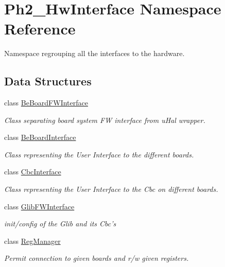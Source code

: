 \hypertarget{namespace_ph2___hw_interface}{
\section{Ph2\_\-Hw\-Interface Namespace Reference}
\label{namespace_ph2___hw_interface}
}
Namespace regrouping all the interfaces to the hardware.  


\subsection*{Data Structures}
\begin{CompactItemize}
\item 
class \hyperlink{class_ph2___hw_interface_1_1_be_board_f_w_interface}{Be\-Board\-FWInterface}
\begin{CompactList}\small\item\em Class separating board system FW interface from u\-Hal wrapper. \item\end{CompactList}\item 
class \hyperlink{class_ph2___hw_interface_1_1_be_board_interface}{Be\-Board\-Interface}
\begin{CompactList}\small\item\em Class representing the User Interface to the different boards. \item\end{CompactList}\item 
class \hyperlink{class_ph2___hw_interface_1_1_cbc_interface}{Cbc\-Interface}
\begin{CompactList}\small\item\em Class representing the User Interface to the Cbc on different boards. \item\end{CompactList}\item 
class \hyperlink{class_ph2___hw_interface_1_1_glib_f_w_interface}{Glib\-FWInterface}
\begin{CompactList}\small\item\em init/config of the Glib and its Cbc's \item\end{CompactList}\item 
class \hyperlink{class_ph2___hw_interface_1_1_reg_manager}{Reg\-Manager}
\begin{CompactList}\small\item\em Permit connection to given boards and r/w given registers. \item\end{CompactList}\item 

\end{CompactItemize}
